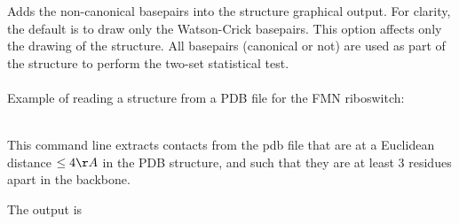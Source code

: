 \subsubsection{} Adds the non-canonical basepairs into the structure graphical output. For clarity, the default is to draw only the Watson-Crick basepairs.
This option affects only the drawing of the structure. All basepairs (canonical or not) are used as part of the structure to perform the two-set statistical test.
\\\\

\noindent
Example of reading a structure from a PDB file for the FMN riboswitch:

\\

\noindent
This command line extracts contacts from the pdb file that are at a
Euclidean distance $\leq 4 \AA$ in the PDB structure, and such that
they are at least 3 residues apart in the backbone.


\noindent
The output is

